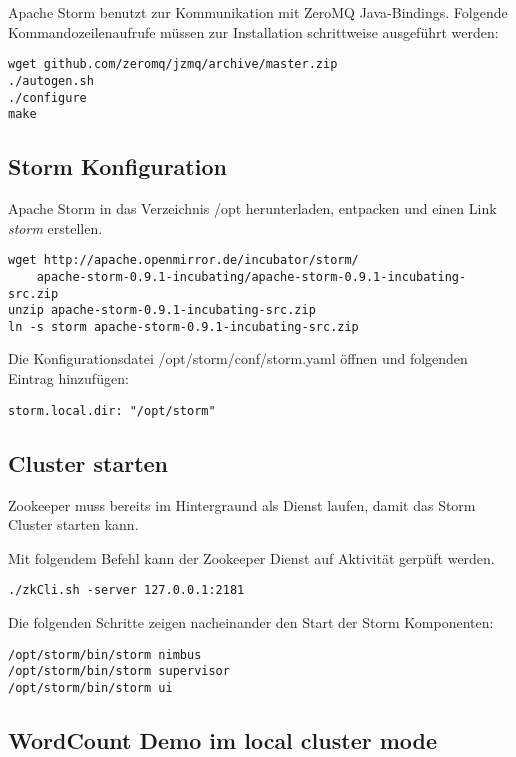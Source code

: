 Apache Storm benutzt zur Kommunikation mit ZeroMQ Java-Bindings. Folgende Kommandozeilenaufrufe müssen zur Installation schrittweise ausgeführt werden:
\begin{verbatim}
wget github.com/zeromq/jzmq/archive/master.zip
./autogen.sh
./configure
make
\end{verbatim}


\subsection{Storm Konfiguration}

Apache Storm in das Verzeichnis /opt herunterladen, entpacken und einen Link \textit{storm} erstellen.
\begin{verbatim}
wget http://apache.openmirror.de/incubator/storm/
	apache-storm-0.9.1-incubating/apache-storm-0.9.1-incubating-src.zip
unzip apache-storm-0.9.1-incubating-src.zip
ln -s storm apache-storm-0.9.1-incubating-src.zip
\end{verbatim}

Die Konfigurationsdatei /opt/storm/conf/storm.yaml öffnen und folgenden Eintrag hinzufügen:
\begin{verbatim}
storm.local.dir: "/opt/storm"
\end{verbatim}


\subsection{Cluster starten}

Zookeeper muss bereits im Hintergraund als Dienst laufen, damit das Storm Cluster starten kann.

Mit folgendem Befehl kann der Zookeeper Dienst auf Aktivität gerpüft werden.
\begin{verbatim}
./zkCli.sh -server 127.0.0.1:2181 
\end{verbatim}

Die folgenden Schritte zeigen nacheinander den Start der Storm Komponenten:

\begin{verbatim}
/opt/storm/bin/storm nimbus
/opt/storm/bin/storm supervisor
/opt/storm/bin/storm ui
\end{verbatim}


\subsection{WordCount Demo im local cluster mode}

